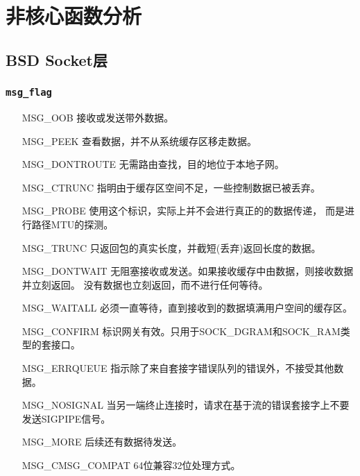 \chapter{非核心函数分析}

\minitoc

    \section{BSD Socket层}
        \subsection{\texttt{msg_flag}}
\begin{enumerate}
\item[MSG\_OOB]         接收或发送带外数据。
\item[MSG\_PEEK]        查看数据，并不从系统缓存区移走数据。
\item[MSG\_DONTROUTE]   无需路由查找，目的地位于本地子网。
\item[MSG\_CTRUNC]      指明由于缓存区空间不足，一些控制数据已被丢弃。
\item[MSG\_PROBE]       使用这个标识，实际上并不会进行真正的的数据传递，
                        而是进行路径MTU的探测。
\item[MSG\_TRUNC]       只返回包的真实长度，并截短(丢弃)返回长度的数据。
\item[MSG\_DONTWAIT]    无阻塞接收或发送。如果接收缓存中由数据，则接收数据并立刻返回。
                        没有数据也立刻返回，而不进行任何等待。
\item[MSG\_WAITALL]     必须一直等待，直到接收到的数据填满用户空间的缓存区。
\item[MSG\_CONFIRM]     标识网关有效。只用于SOCK\_DGRAM和SOCK\_RAM类型的套接口。
\item[MSG\_ERRQUEUE]    指示除了来自套接字错误队列的错误外，不接受其他数据。
\item[MSG\_NOSIGNAL]    当另一端终止连接时，请求在基于流的错误套接字上不要发送SIGPIPE信号。
\item[MSG\_MORE]        后续还有数据待发送。
\item[MSG\_CMSG\_COMPAT]64位兼容32位处理方式。
\end{enumerate}
